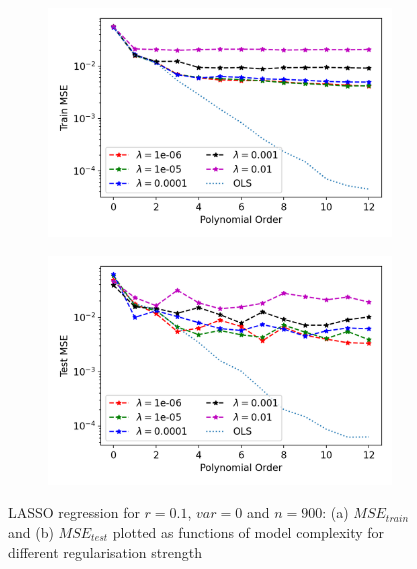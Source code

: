 \begin{figure}[htb]
\centering
\begin{subfigure}{.5\textwidth}
  \centering
  \includegraphics[width=.9\linewidth]{Images/lasso7b.png}
  \caption{}
  \label{fig:lasso7}
\end{subfigure}%
\begin{subfigure}{.5\textwidth}
  \centering
  \includegraphics[width=.9\linewidth]{Images/lasso7.png}
  \caption{}
  \label{fig:lasso7b}
\end{subfigure}
\caption{LASSO regression for $r=0.1$, $var=0$ and $n=900$: (a) $MSE_{train}$ and (b) $MSE_{test}$ plotted as functions of model complexity for different regularisation strength}
\label{fig:Lasso1}
\end{figure}

